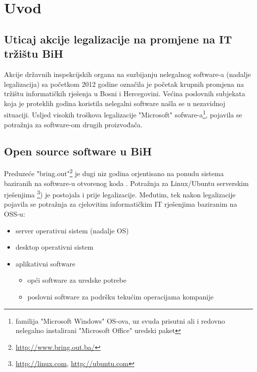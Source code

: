 \documentclass[times, utf8, seminar]{fit}
\begin{document}

\chapter{Uvod}

\section{Uticaj akcije legalizacije na promjene na IT tržištu BiH}

Akcije državnih inspekcijskih organa na suzbijanju nelegalnog software-a (nadalje legalizacija) sa početkom 2012 godine označila je početak krupnih promjena na tržištu informatičkih  rješenja u Bosni i Hercegovini. 
Većina poslovnih subjekata koja je proteklih godina koristila nelegalni software  našla se u nezavidnoj situaciji.
Usljed visokih troškova legalizacije "Microsoft" sofware-a\footnote{familija "Microsoft Windows" OS-ova, uz svuda prisutni ali i redovno nelegalno instalirani "Microsoft Office" uredski paket}, pojavila se potražnja za software-om drugih proizvođača.  

\section{Open source software u BiH}

Preduzeće "bring.out"\footnote{\url{http://www.bring.out.ba/}} je dugi niz godina orjentisano na ponudu sistema baziranih na software-u otvorenog koda .
Potražnja za Linux/Ubuntu serverskim rješenjima \footnote{\url{http://linux.com}, \url{http://ubuntu.com}}) je postojala i prije legalizacije. Međutim, tek nakon legalizacije pojavila se potražnja za cjelovitim informatičkim IT rješenjima baziranim na OSS-u:
\begin{itemize}
  \item server operativni sistem (nadalje OS)
  \item desktop operativni sistem
  \item aplikativni software
  \begin{itemize}
    \item opći software za uredske potrebe
    \item poslovni software za podršku tekućim operacijama kompanije 
  \end{itemize}
\end{itemize}
\end{document}

